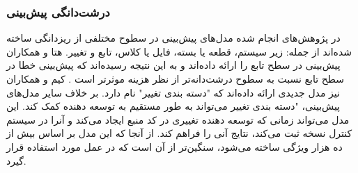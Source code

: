 \subsubsection{درشت‌دانگی پیش‌بینی }
در پژوهش‌های انجام شده مدل‌های پیش‌بینی در سطوح مختلفی از ریزدانگی ساخته شده‌اند از جمله: زیر سیستم، قطعه یا بسته، فایل یا کلاس، تابع و تغییر. هتا و همکاران  پیش‌بینی در سطح تابع را ارائه داده‌اند و به این نتیجه رسیده‌اند که پیش‌بینی خطا در سطح تابع نسبت به سطوح درشت‌دانه‌تر از نظر هزینه موثرتر است \cite{hata2012bug}. کیم و همکاران نیز مدل جدیدی ارائه داده‌اند که "دسته بندی تغییر" نام دارد. بر خلاف سایر مدل‌های پیش‌بینی، "دسته بندی تغییر می‌تواند به طور مستقیم به توسعه دهنده کمک کند. این مدل می‌تواند زمانی که توسعه دهنده تغییری در کد منبع ایجاد می‌کند و آنرا در سیستم کنترل نسخه ثبت می‌کند، نتایج آنی را فراهم کند.  از آنجا که این مدل بر اساس بیش از ده هزار ویژگی ساخته می‌شود، سنگین‌تر از آن است که در عمل مورد استفاده قرار گیرد\cite{kim2008classifying}. \\


